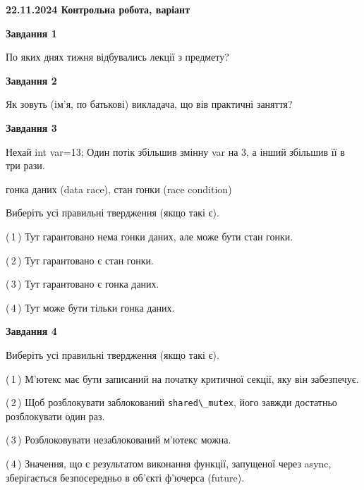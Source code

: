 \documentclass[12pt, ukrainian]{article}
\def\code#1{\Verb!#1!}
\begin{document}
\begin {large}

\textbf{22.11.2024 Контрольна робота, варіант  }\par


{

\begin{center}
\textbf{Завдання 1}
\end{center}

По яких днях тижня відбувались лекції з предмету?


\begin{center}
\textbf{Завдання 2}
\end{center}

Як зовуть (ім'я, по батькові) викладача, що вів практичні заняття?


\begin{center}
\textbf{Завдання 3}
\end{center}

Нехай int var=13; Один потік збільшив змінну var на 3, а інший збільшив її в три рази.

гонка даних (data race), стан гонки (race condition)

Виберіть усі правильні твердження (якщо такі є).\par
\vspace{2mm}
(\,1\,) Тут гарантовано нема гонки даних, але може бути стан гонки.%

(\,2\,) Тут гарантовано є стан гонки.%

(\,3\,) Тут гарантовано є гонка даних.%

(\,4\,) Тут може бути тільки гонка даних.%


\begin{center}
\textbf{Завдання 4}
\end{center}

Виберіть усі правильні твердження (якщо такі є).\par
\vspace{2mm}

(\,1\,) М’ютекс має бути записаний на початку критичної секції, яку він забезпечує.%

(\,2\,) Щоб розблокувати заблокований \code{shared\_mutex}, його завжди достатньо розблокувати один раз.%

(\,3\,) Розблоковувати незаблокований м’ютекс можна.%

(\,4\,) Значення, що є результатом виконання функції, запущеної через async, зберігається безпосередньо в об’єкті ф’ючерса (future).%


}
\end{large}
\end{document}

